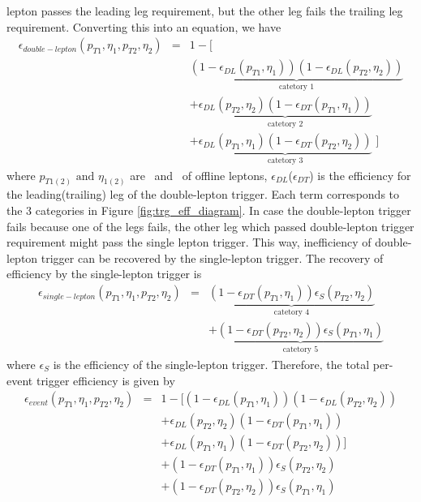 lepton passes the leading leg requirement, but the other leg fails the trailing leg 
requirement. Converting this into an equation, we have 
\begin{eqnarray} 
\label{eq:doubletrgeff}
\epsilon_{double-lepton} \left( p_{T1},\eta_1,p_{T2},\eta_2 \right)
&=&    
1 - \Big[   \\ 
& & 
\underbrace{
\left(1 - \epsilon_{DL}\left(p_{T1}, \eta_1\right)\right)
\left(1 - \epsilon_{DL}\left(p_{T2}, \eta_2\right)\right)  
}_\text{catetory 1} \\
& & 
+ \underbrace{
\epsilon_{DL}\left(p_{T2}, \eta_2\right)\left(1 - \epsilon_{DT}\left(p_{T1}, \eta_1\right)\right)
}_\text{catetory 2} \\
& &
+ \underbrace{
\epsilon_{DL}\left(p_{T1}, \eta_1\right)\left(1 - \epsilon_{DT}\left(p_{T2}, \eta_2\right)\right) 
}_\text{catetory 3}
\,\, \Big]
\end{eqnarray} 
where $p_{T1(2)} \textrm{ and } \eta_{1(2)}$ are \pt~and \Eta~of offline leptons, 
$\epsilon_{DL}$($\epsilon_{DT}$) is the efficiency for the leading(trailing) leg 
of the double-lepton trigger. 
Each term corresponds to the 3 categories in Figure \ref{fig:trg_eff_diagram}.
In case the double-lepton trigger fails because one of the legs fails, the other leg 
which passed double-lepton trigger requirement might pass the single lepton trigger. 
This way, inefficiency of double-lepton trigger can be recovered by the single-lepton trigger.
The recovery of efficiency by the single-lepton trigger is  
\begin{eqnarray} 
\label{eq:singletrgeff}
\epsilon_{single-lepton} \left( p_{T1},\eta_1,p_{T2},\eta_2 \right)
&=&    
\underbrace{
\left(1 - \epsilon_{DT}\left(p_{T1}, \eta_1\right)\right)
\epsilon_{S}\left(p_{T2}, \eta_2\right)  
}_\text{catetory 4} \\
& & 
+ \underbrace{
\left(1 - \epsilon_{DT}\left(p_{T2}, \eta_2\right)\right)
\epsilon_{S}\left(p_{T1}, \eta_1\right)  
}_\text{catetory 5} 
\end{eqnarray}
where $\epsilon_{S}$ is the efficiency of the single-lepton trigger. 
Therefore, the total per-event trigger efficiency is given by 
\begin{eqnarray} 
\label{eq:doubletrgeff}
\epsilon_{event} \left( p_{T1},\eta_1,p_{T2},\eta_2 \right)
&=&    
1 - \Big[    
\left(1 - \epsilon_{DL}\left(p_{T1}, \eta_1\right)\right)
\left(1 - \epsilon_{DL}\left(p_{T2}, \eta_2\right)\right)  \\ 
& & 
+ \epsilon_{DL}\left(p_{T2}, \eta_2\right)\left(1 - \epsilon_{DT}\left(p_{T1}, \eta_1\right)\right) \\
& &
+ \epsilon_{DL}\left(p_{T1}, \eta_1\right)\left(1 - \epsilon_{DT}\left(p_{T2}, \eta_2\right)\right)  
\Big] \\
& &
+ \left(1 - \epsilon_{DT}\left(p_{T1}, \eta_1\right)\right)
\epsilon_{S}\left(p_{T2}, \eta_2\right)  \\ 
& & 
+ \left(1 - \epsilon_{DT}\left(p_{T2}, \eta_2\right)\right)
\epsilon_{S}\left(p_{T1}, \eta_1\right)  
\end{eqnarray} 

